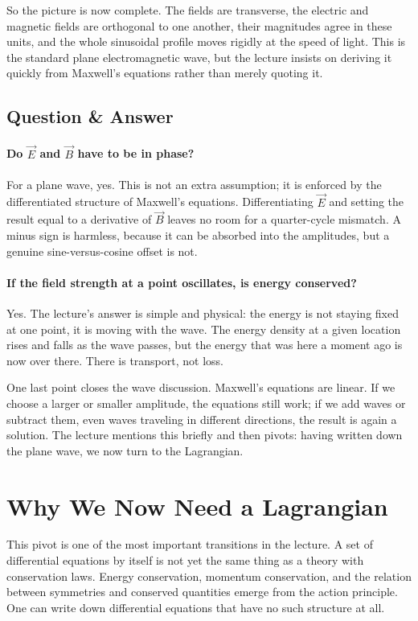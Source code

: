 So the picture is now complete. The fields are transverse, the electric and magnetic fields are orthogonal to one another, their magnitudes agree in these units, and the whole sinusoidal profile moves rigidly at the speed of light. This is the standard plane electromagnetic wave, but the lecture insists on deriving it quickly from Maxwell's equations rather than merely quoting it.

\subsection{Question \& Answer}

\paragraph{Do \(\vec E\) and \(\vec B\) have to be in phase?}
For a plane wave, yes. This is not an extra assumption; it is enforced by the differentiated structure of Maxwell's equations. Differentiating \(\vec E\) and setting the result equal to a derivative of \(\vec B\) leaves no room for a quarter-cycle mismatch. A minus sign is harmless, because it can be absorbed into the amplitudes, but a genuine sine-versus-cosine offset is not.

\paragraph{If the field strength at a point oscillates, is energy conserved?}
Yes. The lecture's answer is simple and physical: the energy is not staying fixed at one point, it is moving with the wave. The energy density at a given location rises and falls as the wave passes, but the energy that was here a moment ago is now over there. There is transport, not loss.

One last point closes the wave discussion. Maxwell's equations are linear. If we choose a larger or smaller amplitude, the equations still work; if we add waves or subtract them, even waves traveling in different directions, the result is again a solution. The lecture mentions this briefly and then pivots: having written down the plane wave, we now turn to the Lagrangian.

\section{Why We Now Need a Lagrangian}

This pivot is one of the most important transitions in the lecture. A set of differential equations by itself is not yet the same thing as a theory with conservation laws. Energy conservation, momentum conservation, and the relation between symmetries and conserved quantities emerge from the action principle. One can write down differential equations that have no such structure at all.

